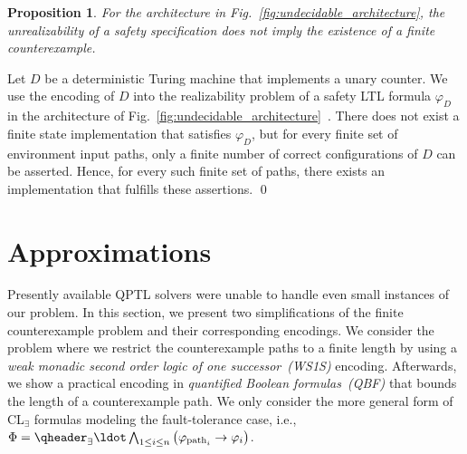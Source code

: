 \documentclass{LMCS}
\theoremstyle{plain}\newtheorem{theorem}[thm]{Theorem}
\theoremstyle{plain}\newtheorem{lemma}[thm]{Lemma}
\theoremstyle{plain}\newtheorem{proposition}[thm]{Proposition}
\theoremstyle{plain}\newtheorem{corollary}[thm]{Corollary}
\theoremstyle{definition}\newtheorem{definition}{Definition}[section]
\begin{document}
\begin{proposition}
  For the architecture in Fig.~\ref{fig:undecidable_architecture}, the unrealizability of a safety specification does not imply the existence of a finite counterexample.
\end{proposition}
\proof
Let $D$ be a deterministic Turing machine that implements a unary counter.
We use the encoding of $D$ into the realizability problem of a safety LTL formula $\varphi_D$ in the architecture of Fig.~\ref{fig:undecidable_architecture}~\cite{DBLP:journals/ipl/Schewe14}.
There does not exist a finite state implementation that satisfies $\varphi_D$, but for every finite set of environment input paths, only a finite number of correct configurations of $D$ can be asserted.
Hence, for every such finite set of paths, there exists an implementation that fulfills these assertions.
\qed


\section{Approximations} 
\label{sec:abstractions}


Presently available QPTL solvers were unable to handle even small instances of our problem.
In this section, we present two simplifications of the finite counterexample problem and their corresponding encodings.
We consider the problem where we restrict the counterexample paths to a finite length by using a \emph{weak monadic second order logic of one successor~(WS1S)} encoding.
Afterwards, we show a practical encoding in \emph{quantified Boolean formulas~(QBF)} that bounds the length of a counterexample path.
We only consider the more general form of CL$_\exists$ formulas modeling the fault-tolerance case, i.e., $\Phi = \qheader_\exists \ldot\allowbreak \bigwedge_{1 \leq i \leq n} \big( \varphi_{\text{path}_i} \rightarrow \varphi_i \big)$.
\end{document}
